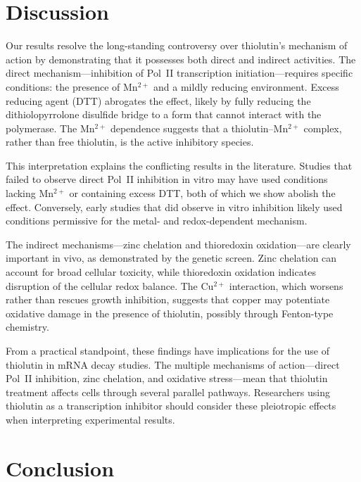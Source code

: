 \documentclass[11pt]{article}
\begin{document}
\section{Discussion}

Our results resolve the long-standing controversy over thiolutin's mechanism of action by demonstrating that it possesses both direct and indirect activities. The direct mechanism---inhibition of Pol~II transcription initiation---requires specific conditions: the presence of Mn$^{2+}$ and a mildly reducing environment. Excess reducing agent (DTT) abrogates the effect, likely by fully reducing the dithiolopyrrolone disulfide bridge to a form that cannot interact with the polymerase. The Mn$^{2+}$ dependence suggests that a thiolutin--Mn$^{2+}$ complex, rather than free thiolutin, is the active inhibitory species.

This interpretation explains the conflicting results in the literature. Studies that failed to observe direct Pol~II inhibition in vitro may have used conditions lacking Mn$^{2+}$ or containing excess DTT, both of which we show abolish the effect. Conversely, early studies that did observe in vitro inhibition \citep{tipper1973} likely used conditions permissive for the metal- and redox-dependent mechanism.

The indirect mechanisms---zinc chelation and thioredoxin oxidation---are clearly important in vivo, as demonstrated by the genetic screen. Zinc chelation can account for broad cellular toxicity, while thioredoxin oxidation indicates disruption of the cellular redox balance. The Cu$^{2+}$ interaction, which worsens rather than rescues growth inhibition, suggests that copper may potentiate oxidative damage in the presence of thiolutin, possibly through Fenton-type chemistry.

From a practical standpoint, these findings have implications for the use of thiolutin in mRNA decay studies. The multiple mechanisms of action---direct Pol~II inhibition, zinc chelation, and oxidative stress---mean that thiolutin treatment affects cells through several parallel pathways. Researchers using thiolutin as a transcription inhibitor should consider these pleiotropic effects when interpreting experimental results.

\section{Conclusion}
\end{document}
